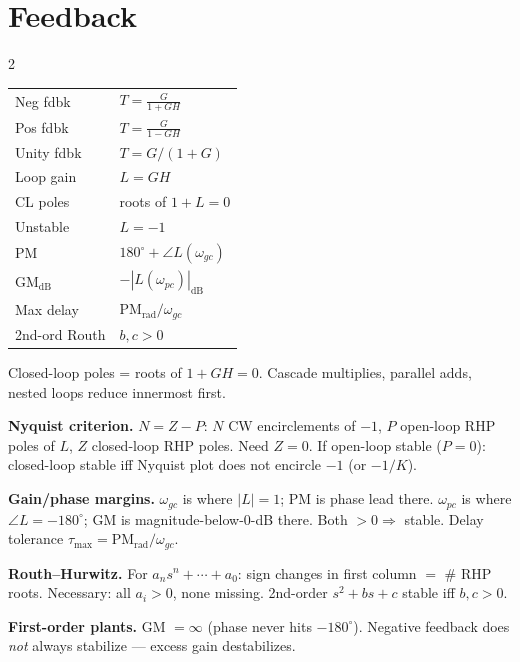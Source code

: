 \documentclass[11pt]{extarticle}
\newcommand{\pairsection}[4]{%
  \needspace{2.8in}%
  \columnratio{#1}%
  \section*{#2}%
  \begin{paracol}{2}%
  #3%
  \switchcolumn%
  #4%
  \end{paracol}%
  \par\vspace{4pt}}
\begin{document}
\pairsection{0.28}{Feedback}{%
\begin{tabular}{@{}l l@{}}
\toprule
Neg fdbk & $T{=}\tfrac{G}{1+GH}$ \\
Pos fdbk & $T{=}\tfrac{G}{1-GH}$ \\
Unity fdbk & $T{=}G/(1{+}G)$ \\
Loop gain & $L{=}GH$ \\
CL poles & roots of $1{+}L{=}0$ \\
Unstable & $L{=}{-}1$ \\
PM & $180^\circ{+}\angle L(\omega_{gc})$ \\
GM$_\mathrm{dB}$ & ${-}|L(\omega_{pc})|_\mathrm{dB}$ \\
Max delay & $\mathrm{PM}_\mathrm{rad}/\omega_{gc}$ \\
2nd-ord Routh & $b,c{>}0$ \\
\bottomrule
\end{tabular}%
}{%
Closed-loop poles = roots of $1+GH=0$. Cascade multiplies, parallel adds, nested loops reduce innermost first.

\textbf{Nyquist criterion.} $N=Z-P$: $N$ CW encirclements of $-1$, $P$ open-loop RHP poles of $L$, $Z$ closed-loop RHP poles. Need $Z=0$. If open-loop stable ($P=0$): closed-loop stable iff Nyquist plot does not encircle $-1$ (or $-1/K$).

\textbf{Gain/phase margins.} $\omega_{gc}$ is where $|L|=1$; PM is phase lead there. $\omega_{pc}$ is where $\angle L=-180^\circ$; GM is magnitude-below-0-dB there. Both $>0 \Rightarrow$ stable. Delay tolerance $\tau_{\max}=\mathrm{PM}_\mathrm{rad}/\omega_{gc}$.

\textbf{Routh--Hurwitz.} For $a_n s^n+\cdots+a_0$: sign changes in first column $=$ \# RHP roots. Necessary: all $a_i>0$, none missing. 2nd-order $s^2+bs+c$ stable iff $b,c>0$.

\textbf{First-order plants.} GM $=\infty$ (phase never hits $-180^\circ$). Negative feedback does \emph{not} always stabilize --- excess gain destabilizes.%
}
\end{document}
